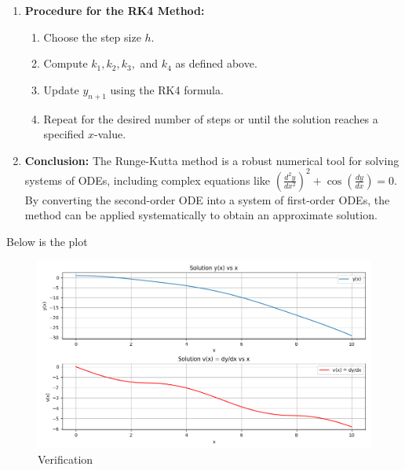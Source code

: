 \documentclass[journal]{IEEEtran}
\begin{document}
    \begin{enumerate}
        \item \textbf{Procedure for the RK4 Method:}
            \begin{enumerate}
                \item Choose the step size \( h \).
                \item Compute \( k_1, k_2, k_3, \) and \( k_4 \) as defined above.
                \item Update \( y_{n+1} \) using the RK4 formula.
                \item Repeat for the desired number of steps or until the solution reaches a specified \( x \)-value.
            \end{enumerate}

        \item \textbf{Conclusion:}
        The Runge-Kutta method is a robust numerical tool for solving systems of ODEs, including complex equations like \((\frac{d^2y}{dx^2})^2 + \cos\left(\frac{dy}{dx}\right) = 0\). By converting the second-order ODE into a system of first-order ODEs, the method can be applied systematically to obtain an approximate solution.
    \end{enumerate}
    \newpage
Below is the plot 
\begin{figure}[h]  %
    \centering  %
    \includegraphics[width=\columnwidth]{fig/Figure_1.png}  
    \caption{Verification}
    \label{fig:example}  %
\end{figure}
\end{document}
